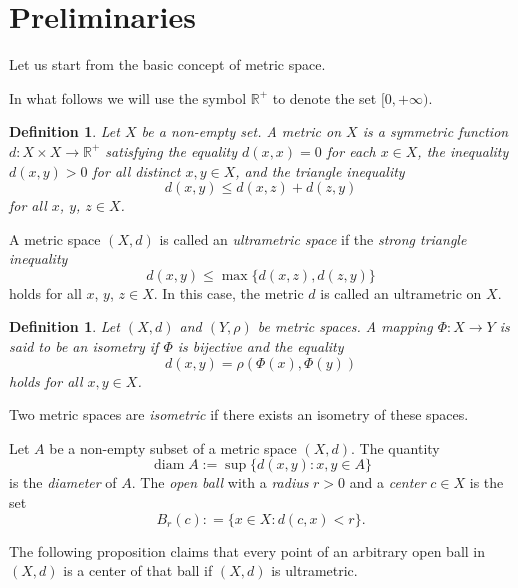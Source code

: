 \documentclass[pdflatex,sn-mathphys-num]{sn-jnl}%
\theoremstyle{thmstyleone}%
\theoremstyle{thmstyletwo}%
\theoremstyle{thmstylethree}%
\newtheorem{Definition}[Theorem]{Definition}
\theoremstyle{thmstyletwo}%
\theoremstyle{thmstylethree}%
\begin{document}
\section{Preliminaries}




Let us start from the basic concept of metric space.

In what follows we will use the symbol $\mathbb R^+$ to denote the set $[0,+\infty)$.

\begin{Definition}\label{deff1}Let $X$ be a non-empty set. A {\it metric} on $X$ is a symmetric function $d\colon X\times X \to \mathbb R^+$ satisfying the equality 
$d(x,x)=0$ for each $x\in X$, the inequality $d(x,y)>0$ for all distinct $x,y\in X$, and  the triangle inequality
 \[d(x,y)\leq d(x,z) + d(z,y)\]
 for all \(x\), \(y \), \(z \in X\).
\end{Definition}


A metric space \((X, d)\) is called an \emph{ultrametric space} if the \emph{strong triangle inequality}
\[
d(x,y)\leq \max \{d(x,z),d(z,y)\}
\]
holds for all \(x\), \(y\), \(z \in X\). In this case, the metric \(d\) is  called an ultrametric on \(X\).





\begin{Definition}\label{eddrr}
Let $(X,d)$ and $(Y,\rho)$ be metric spaces. A  mapping
\(
\Phi \colon X \to Y
\)
is said to be an {\it isometry} if $\Phi$ is bijective and the equality
\[
d(x,y) = \rho(\Phi(x), \Phi(y))
\]
holds for all $x,y \in X$. 
\end{Definition}

Two metric spaces are \emph{isometric} if there exists an
isometry of these spaces.


Let $A$ be a non-empty subset of a metric space $(X,d)$. The quantity
\begin{equation}\label{lokias}
    \operatorname{diam} A := \sup\{ d(x,y) : x,y \in A \}
\end{equation}
is the \emph{diameter} of $A$.  The \emph{open ball} with a \emph{radius} \(r > 0\) and a \emph{center} \(c \in X\) is the set
\begin{equation}
    \label{02}
B_r(c): = \{x \in X \colon d(c, x) < r\}.
\end{equation}


The following proposition claims that every point of an arbitrary open ball  in $(X,d)$ is a center of that ball if $(X,d)$ is ultrametric.
\end{document}
